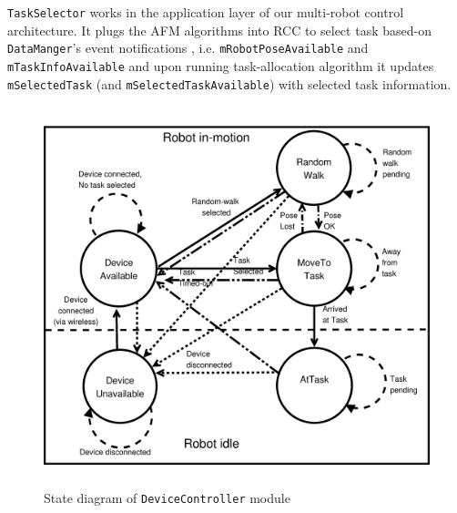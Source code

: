 \documentclass[final,5p,times,twocolumn]{elsarticle}
\begin{document}
\texttt{TaskSelector} works in the application layer of our multi-robot control architecture. It plugs the AFM algorithms into RCC to select task based-on \texttt{DataManger}'s event notifications , i.e. \texttt{mRobotPoseAvailable} and\\ \texttt{mTaskInfoAvailable} and upon running task-allocation algorithm it updates  \texttt{mSelectedTask} (and \texttt{mSelectedTaskAvailable}) with selected task information.
\begin{figure}
\centering
\includegraphics[width=0.7\linewidth,height=11cm]
{./images/rcc-device-controller-state.eps}
\caption{State diagram of \texttt{DeviceController} module}
\label{fig:dc-states} %
\end{figure}
\end{document}

